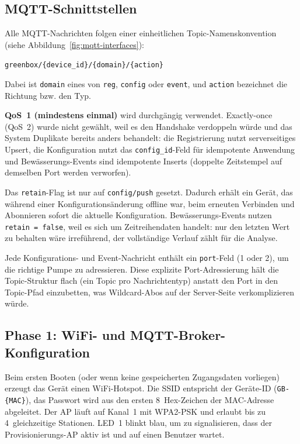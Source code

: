 \documentclass[a4paper,12pt]{article}
\begin{document}
\subsection{MQTT-Schnittstellen}

Alle MQTT-Nachrichten folgen einer einheitlichen Topic-Namenskonvention
(siehe Abbildung~\ref{fig:mqtt-interfaces}):

\begin{center}
\texttt{greenbox/\{device\_id\}/\{domain\}/\{action\}}
\end{center}

\noindent Dabei ist \texttt{domain} eines von \texttt{reg},
\texttt{config} oder \texttt{event}, und \texttt{action} bezeichnet
die Richtung bzw. den Typ.

\textbf{QoS~1 (mindestens einmal)} wird durchgängig verwendet.
Exactly-once (QoS~2) wurde nicht gewählt, weil es den Handshake
verdoppeln würde und das System Duplikate bereits anders behandelt:
die Registrierung nutzt serverseitiges Upsert, die Konfiguration
nutzt das \texttt{config\_id}-Feld für idempotente Anwendung und
Bewässerungs-Events sind idempotente Inserts (doppelte Zeitstempel
auf demselben Port werden verworfen).

Das \texttt{retain}-Flag ist nur auf \texttt{config/push} gesetzt.
Dadurch erhält ein Gerät, das während einer Konfigurationsänderung
offline war, beim erneuten Verbinden und Abonnieren sofort die
aktuelle Konfiguration. Bewässerungs-Events nutzen
\texttt{retain = false}, weil es sich um Zeitreihendaten handelt:
nur den letzten Wert zu behalten wäre irreführend, der vollständige
Verlauf zählt für die Analyse.

Jede Konfigurations- und Event-Nachricht enthält ein
\texttt{port}-Feld (1 oder 2), um die richtige Pumpe zu adressieren.
Diese explizite Port-Adressierung hält die Topic-Struktur flach (ein
Topic pro Nachrichtentyp) anstatt den Port in den Topic-Pfad
einzubetten, was Wildcard-Abos auf der Server-Seite verkomplizieren
würde.

\subsection{Phase 1: WiFi- und MQTT-Broker-Konfiguration}

Beim ersten Booten (oder wenn keine gespeicherten Zugangsdaten
vorliegen) erzeugt das Gerät einen WiFi-Hotspot. Die SSID entspricht
der Geräte-ID (\texttt{GB-\{MAC\}}), das Passwort wird aus den ersten
8~Hex-Zeichen der MAC-Adresse abgeleitet. Der AP läuft auf Kanal~1
mit WPA2-PSK und erlaubt bis zu 4~gleichzeitige Stationen. LED~1
blinkt blau, um zu signalisieren, dass der Provisionierungs-AP aktiv
ist und auf einen Benutzer wartet.
\end{document}
